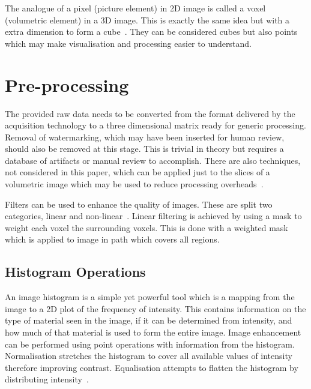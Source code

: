 \documentclass[journal]{IEEEtran}
\begin{document}
The analogue of a pixel (picture element) in 2D image is called a voxel (volumetric element) in a 3D image.
This is exactly the same idea but with a extra dimension to form a cube~\cite{lohmann1998volumetric}.
They can be considered cubes but also points which may make visualisation and processing easier to understand.










\section{Pre-processing}
\label{sec:pre}

The provided raw data needs to be converted from the format delivered by the acquisition technology to a three dimensional matrix ready for generic processing.
Removal of watermarking, which may have been inserted for human review, should also be removed at this stage. 
This is trivial in theory but requires a database of artifacts or manual review to accomplish.
There are also techniques, not considered in this paper, which can be applied just to the slices of a volumetric image which may be used to reduce processing overheads~\cite{harauz86exact}.

Filters can be used to enhance the quality of images.
These are split two categories, linear and non-linear~\cite{lohmann1998volumetric}.
Linear filtering is achieved by using a mask to weight each voxel the surrounding voxels.
This is done with a weighted mask which is applied to image in path which covers all regions.


\subsection{Histogram Operations}

An image histogram is a simple yet powerful tool which is a mapping from the image to a 2D plot of the frequency of intensity.
This contains information on the type of material seen in the image, if it can be determined from intensity, and how much of that material is used to form the entire image.
Image enhancement can be performed using point operations with information from the histogram.
Normalisation stretches the histogram to cover all available values of intensity therefore improving contrast.
Equalisation attempts to flatten the histogram by distributing intensity~\cite{nixon02feature}.
\end{document}
